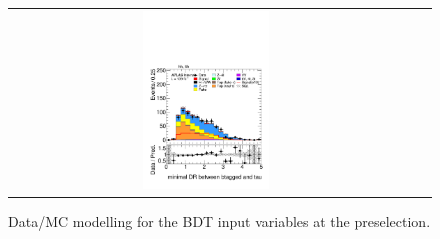 \begin{figure}[htbp]
\begin{tabular}{@{}c c c@{}}
      \includegraphics[width=0.33\textwidth]{images/modelling_tmva_vars/plot_minDRbtau_hh_tth.pdf}
    \end{tabular}
  
    \caption{Data/MC modelling for the \ttH BDT input variables at the \ttHtt preselection.}
    \label{tth_vars_modelling_1}
\end{figure}

